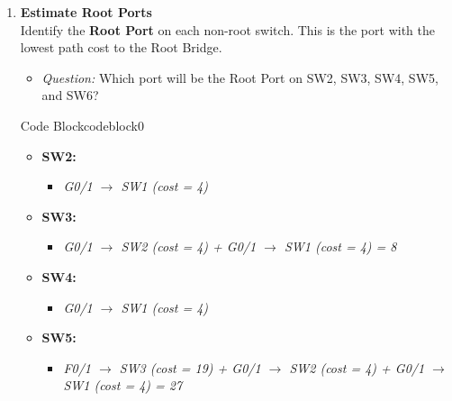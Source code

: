 \documentclass[a4paper]{book}
\begin{document}
\begin{enumerate}
    \item \textbf{Estimate Root Ports} \\
    Identify the \textbf{Root Port} on each non-root switch. This is the port with the lowest path cost to the Root Bridge.
    \begin{itemize}
        \item \textit{Question:} Which port will be the Root Port on SW2, SW3, SW4, SW5, and SW6?
    \end{itemize}



\begin{ocg}{Code Block}{codeblock}{0}
\vspace{0.5cm}
\begin{tcolorbox}
\small{
    \begin{itemize}
        \item \textbf{SW2:}
        \begin{itemize}
            \item \textit{G0/1 $\rightarrow$ SW1 (cost = 4)}
        \end{itemize}
        
        \item \textbf{SW3:}
        \begin{itemize}
            \item \textit{G0/1 $\rightarrow$ SW2 (cost = 4) + G0/1 $\rightarrow$ SW1 (cost = 4) = 8}
        \end{itemize}
        
        \item \textbf{SW4:}
        \begin{itemize}
            \item \textit{G0/1 $\rightarrow$ SW1 (cost = 4)}
        \end{itemize}
        
        \item \textbf{SW5:}
        \begin{itemize}
            \item \textit{F0/1 $\rightarrow$ SW3 (cost = 19) + G0/1 $\rightarrow$ SW2 (cost = 4) + G0/1 $\rightarrow$ SW1 (cost = 4) = 27}
        \end{itemize}
        

\end{itemize}}
\end{tcolorbox}
\end{ocg}
\end{enumerate}
\end{document}
